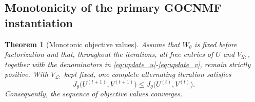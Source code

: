\documentclass[11pt]{article}
\newtheorem{theorem}{Theorem}
\theoremstyle{remark}
\begin{document}
\subsection{Monotonicity of the primary GOCNMF instantiation}

\begin{theorem}[Monotonic objective values]\label{thm:monotonicity}
Assume that \(W_{\theta}\) is fixed before factorization and that,
throughout the iterations, all free entries of \(U\) and
\(V_{\mathcal U:}\), together with the denominators in
\eqref{eq:update_u}-\eqref{eq:update_v}, remain strictly positive.
With \(V_{\mathcal L:}\) kept fixed, one complete alternating iteration
satisfies
\[
J_{\theta}\bigl(U^{(t+1)},V^{(t+1)}\bigr)
\le
J_{\theta}\bigl(U^{(t)},V^{(t)}\bigr).
\]
Consequently, the sequence of objective values converges.
\end{theorem}
\end{document}
